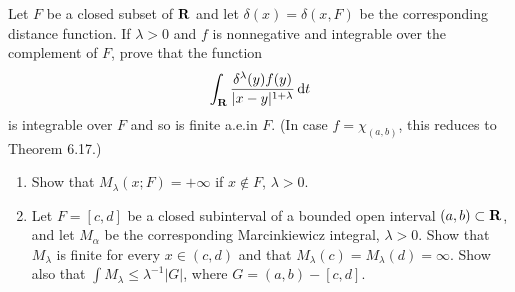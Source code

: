 \begin{problem}
  Let $F$ be a closed subset of $\mathbf{R}$ and let $\delta(x)=\delta(x,F)$ be
  the corresponding distance function. If $\lambda>0$ and $f$ is
  nonnegative and integrable over the complement of $F$, prove that the
  function
  \[
    \int_{\mathbf{R}}\frac{\delta^\lambda(y)f(y)}{|x-y|^{1+\lambda}}\mathop{}\!\mathrm{d} t
  \]
  is integrable over $F$ and so is finite a.e.\@ in $F$. (In case
  $f=\chi_{(a,b)}$, this reduces to Theorem 6.17.)
\end{problem}
\begin{solution}
\end{solution}

\begin{problem}
  \hfill
  \begin{enumerate}[label=(\alph*)]
  \item Show that $M_\lambda(x;F)=+\infty$ if $x\notin F$, $\lambda>0$.
  \item Let $F=[c,d]$ be a closed subinterval of a bounded open interval
    $(a,b)\subset\mathbf{R}$, and let $M_\alpha$ be the corresponding
    Marcinkiewicz integral, $\lambda>0$. Show that $M_\lambda$ is finite
    for every $x\in(c,d)$ and that $M_\lambda(c)=M_\lambda(d)=\infty$. Show
    also that $\int M_\lambda\leq\lambda^{-1}|G|$, where $G=(a,b)-[c,d]$.
  \end{enumerate}
\end{problem}
\begin{solution}
\end{solution}

